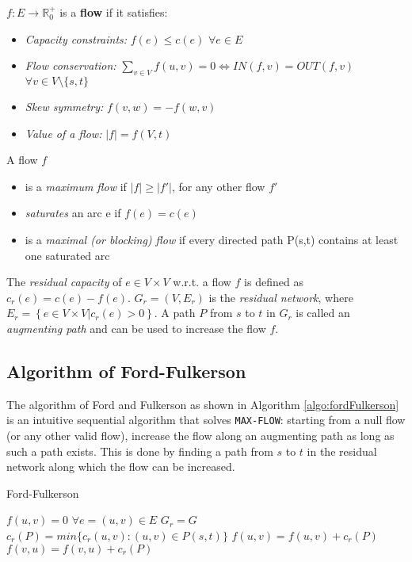 \documentclass[a4paper,10pt, twocolumn]{article}
\begin{document}
\medskip
$f:E \rightarrow \mathbb{R}_0^{+}$ is a \textbf{flow} if it satisfies:
\begin{itemize}
	\item \emph{Capacity constraints:} $f(e) \leq c(e)$ $\forall e \in E$
	\item \emph{Flow conservation:} 
	$ \sum\limits_{v \in V} f(u,v) =  0 \Leftrightarrow IN(f,v) = OUT(f,v)$ $\forall v \in V \setminus \{s,t\}$
	\item \emph{Skew symmetry:} $f(v,w) = -f(w,v)$
	\item \emph{Value of a flow:} $\lvert f\rvert = f(V,t)$ 
\end{itemize}

A flow $f$
\begin{itemize}
	\item is a \emph{maximum flow} if $\lvert f\rvert \geq \lvert f'\rvert$, for any other flow $f'$
	\item \emph{saturates} an arc e if $f(e) = c(e)$
	\item is a \emph{maximal (or blocking) flow} if every directed path P(s,t) contains at least one saturated arc
\end{itemize}
\medskip
The \emph{residual capacity} of $e \in V \times V$ w.r.t. a flow $f$ is defined as $c_r(e) = c(e) - f(e)$. $G_r = (V, E_r)$ is the \emph{residual network}, where $E_r = \left\{e \in V \times V \lvert c_r(e) > 0\right\}$. A path $P$ from $s$ to $t$ in $G_r$ is called an \emph{augmenting path} and can be used to increase the flow $f$.

\subsection{Algorithm of Ford-Fulkerson}
\label{sec:fordfulkerson}
The algorithm of Ford and Fulkerson as shown in Algorithm \ref{algo:fordFulkerson} is an intuitive sequential algorithm that solves \lstinline|MAX-FLOW|: starting from a null flow (or any other valid flow), increase the flow along an augmenting path as long as such a path exists. This is done by finding a path from $s$ to $t$ in the residual network along which the flow can be increased. 

\begin{algorithm}
\caption{Ford-Fulkerson}
\label{algo:fordFulkerson}
\begin{algorithmic}[1]
	\State $f(u,v) = 0$ $\forall e=(u,v) \in E$ 
	\State  $G_r = G$ 
		\State $c_r(P) = min \{c_r(u,v): (u,v) \in P(s,t) \}$
		\State $f(u,v) = f(u,v) + c_r(P)$ 
		\State $f(v,u) = f(v,u) + c_r(P)$ 
	\EndWhile
	\EndFunction
\end{algorithmic}
\end{algorithm}
\end{document}

